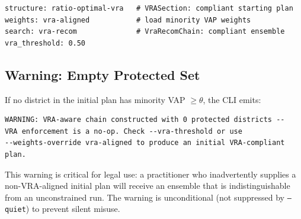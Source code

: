 \begin{verbatim}
structure: ratio-optimal-vra   # VRASection: compliant starting plan
weights: vra-aligned           # load minority VAP weights
search: vra-recom              # VraRecomChain: compliant ensemble
vra_threshold: 0.50
\end{verbatim}

\subsection{Warning: Empty Protected Set}

If no district in the initial plan has minority VAP $\geq \theta$, the CLI
emits:

\begin{verbatim}
WARNING: VRA-aware chain constructed with 0 protected districts --
VRA enforcement is a no-op. Check --vra-threshold or use
--weights-override vra-aligned to produce an initial VRA-compliant plan.
\end{verbatim}

This warning is critical for legal use: a practitioner who inadvertently
supplies a non-VRA-aligned initial plan will receive an ensemble that is
indistinguishable from an unconstrained \fr{} run.
The warning is unconditional (not suppressed by \texttt{--quiet}) to prevent
silent misuse.
